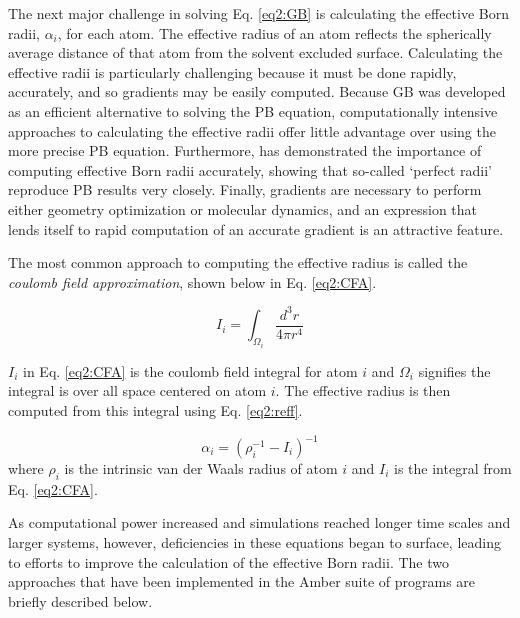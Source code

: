 The next major challenge in solving Eq. \ref{eq2:GB} is calculating the
effective Born radii, $\alpha_i$, for each atom. The effective radius of an atom
reflects the spherically average distance of that atom from the solvent excluded
surface. Calculating the effective radii is particularly challenging because it
must be done rapidly, accurately, and so gradients may be easily computed.
Because GB was developed as an efficient alternative to solving the PB equation,
computationally intensive approaches to calculating the effective radii offer
little advantage over using the more precise PB equation. Furthermore,
\citeauthor{Onufriev_JComputChem_2002_v23_p1297} has demonstrated the importance
of computing effective Born radii accurately,
\cite{Onufriev_JComputChem_2002_v23_p1297} showing that so-called `perfect
radii' reproduce PB results very closely. Finally, gradients are necessary to
perform either geometry optimization or molecular dynamics, and an expression
that lends itself to rapid computation of an accurate gradient is an attractive
feature.

The most common approach to computing the effective radius is called the
\emph{coulomb field approximation}, shown below in Eq. \ref{eq2:CFA}.
\cite{Cramer_Book_EssentialsCompChem_2004}

\begin{equation}
   I _ i = \int _ {\Omega_i} \frac {d^3r} {4 \pi r ^ 4}
   \label{eq2:CFA}
\end{equation}

$I_i$ in Eq. \ref{eq2:CFA} is the coulomb field integral for atom $i$ and
$\Omega_i$ signifies the integral is over all space centered on atom $i$. The
effective radius is then computed from this integral using Eq. \ref{eq2:reff}.

\begin{equation}
   \alpha _ {i} = \left( \rho _ i ^ {-1} - I _ i \right) ^ {-1}
   \label{eq2:reff}
\end{equation}
where $\rho_i$ is the intrinsic van der Waals radius of atom $i$ and $I_i$ is
the integral from Eq. \ref{eq2:CFA}.

As computational power increased and simulations reached longer time scales and
larger systems, however, deficiencies in these equations began to surface,
leading to efforts to improve the calculation of the effective Born radii.
\cite{Onufriev_JComputChem_2002_v23_p1297, Onufriev_Proteins_2004_v55_p383,
Mongan_JChemTheoryComput_2007_v3_p156, Nguyen_JChemTheoryComput_2013_ASAP} The
two approaches that have been implemented in the Amber suite of programs are
briefly described below.

